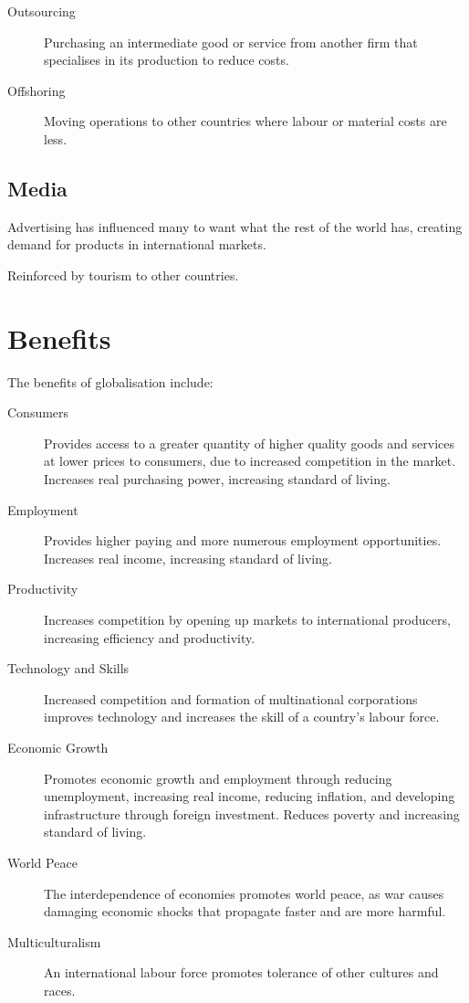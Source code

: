 \documentclass[a4paper,11pt]{article}
\begin{document}
\begin{description}
\item [Outsourcing] Purchasing an intermediate good or service from another
	firm that specialises in its production to reduce costs.
\item [Offshoring] Moving operations to other countries where labour or
	material costs are less.
\end{description}


\subsection{Media}

Advertising has influenced many to want what the rest of the world has,
creating demand for products in international markets.

Reinforced by tourism to other countries.




\section{Benefits}

The benefits of globalisation include:

\begin{description}
\item [Consumers] Provides access to a greater quantity of higher quality goods
	and services at lower prices to consumers, due to increased competition in
	the market.  Increases real purchasing power, increasing standard of living.
\item [Employment] Provides higher paying and more numerous employment
	opportunities. Increases real income, increasing standard of living.
\item [Productivity] Increases competition by opening up markets to
	international producers, increasing efficiency and productivity.
\item [Technology and Skills] Increased competition and formation of
	multinational corporations improves technology and increases the skill of a
	country's labour force.
\item [Economic Growth] Promotes economic growth and employment through
	reducing unemployment, increasing real income, reducing inflation, and
	developing infrastructure through foreign investment. Reduces poverty and
	increasing standard of living.
\item [World Peace] The interdependence of economies promotes world peace, as
	war causes damaging economic shocks that propagate faster and are more
	harmful.
\item [Multiculturalism] An international labour force promotes tolerance of
	other cultures and races.
\end{description}
\end{document}
